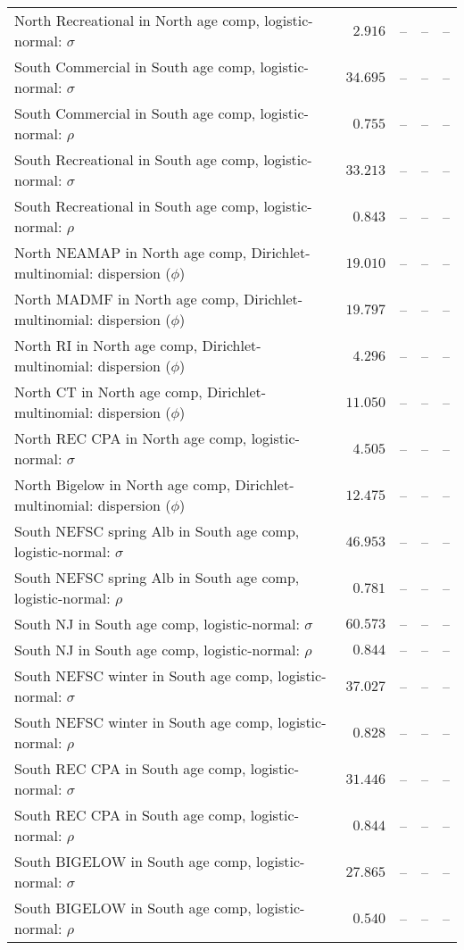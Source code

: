 \documentclass[
]{article}
\begin{document}
\begin{landscape}
\begin{longtable}[t]{lrrrr}
North Recreational in North age comp, logistic-normal: $\sigma$ & $2.916$ & -- & -- & --\\
\addlinespace
South Commercial in South age comp, logistic-normal: $\sigma$ & $34.695$ & -- & -- & --\\
South Commercial in South age comp, logistic-normal: $\rho$ & $0.755$ & -- & -- & --\\
South Recreational in South age comp, logistic-normal: $\sigma$ & $33.213$ & -- & -- & --\\
South Recreational in South age comp, logistic-normal: $\rho$ & $0.843$ & -- & -- & --\\
North NEAMAP in North age comp, Dirichlet-multinomial: dispersion ($\phi$) & $19.010$ & -- & -- & --\\
\addlinespace
North MADMF in North age comp, Dirichlet-multinomial: dispersion ($\phi$) & $19.797$ & -- & -- & --\\
North RI in North age comp, Dirichlet-multinomial: dispersion ($\phi$) & $4.296$ & -- & -- & --\\
North CT in North age comp, Dirichlet-multinomial: dispersion ($\phi$) & $11.050$ & -- & -- & --\\
North REC CPA in North age comp, logistic-normal: $\sigma$ & $4.505$ & -- & -- & --\\
North Bigelow in North age comp, Dirichlet-multinomial: dispersion ($\phi$) & $12.475$ & -- & -- & --\\
\addlinespace
South NEFSC spring Alb in South age comp, logistic-normal: $\sigma$ & $46.953$ & -- & -- & --\\
South NEFSC spring Alb in South age comp, logistic-normal: $\rho$ & $0.781$ & -- & -- & --\\
South NJ in South age comp, logistic-normal: $\sigma$ & $60.573$ & -- & -- & --\\
South NJ in South age comp, logistic-normal: $\rho$ & $0.844$ & -- & -- & --\\
South NEFSC winter in South age comp, logistic-normal: $\sigma$ & $37.027$ & -- & -- & --\\
\addlinespace
South NEFSC winter in South age comp, logistic-normal: $\rho$ & $0.828$ & -- & -- & --\\
South REC CPA in South age comp, logistic-normal: $\sigma$ & $31.446$ & -- & -- & --\\
South REC CPA in South age comp, logistic-normal: $\rho$ & $0.844$ & -- & -- & --\\
South BIGELOW in South age comp, logistic-normal: $\sigma$ & $27.865$ & -- & -- & --\\
South BIGELOW in South age comp, logistic-normal: $\rho$ & $0.540$ & -- & -- & --\\*
\end{longtable}
\end{landscape}
\end{document}
